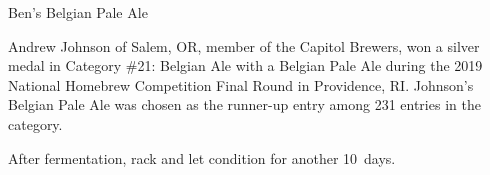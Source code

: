 \stylesection{\stylebelgianpaleale}

\begin{recipie}{Ben's Belgian Pale Ale}

\begin{aboutblock}
Andrew Johnson of Salem, OR, member of the Capitol Brewers, won a silver medal in
Category \#21: Belgian Ale with a Belgian Pale Ale during the 2019 National Homebrew
Competition Final Round in Providence, RI. Johnson's Belgian Pale Ale was chosen as
the runner-up entry among 231 entries in the category.
\end{aboutblock}


\begin{methodandtiming}
 
\begin{mashsteps}
\end{mashsteps}

\begin{fermentationsteps}
\end{fermentationsteps}

\begin{directions}
After fermentation, rack and let condition for another 10~days.
\end{directions}

\end{methodandtiming}

\pagebreak

\begin{ingredientsblock}

\begin{malts}
\end{malts}

\begin{hops}
\end{hops}

\begin{yeasts}
\end{yeasts}

\end{ingredientsblock}

\end{recipie}
